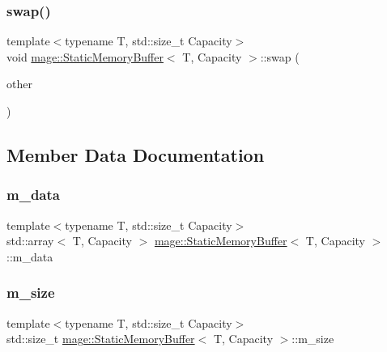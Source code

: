 \subsubsection{\texorpdfstring{swap()}{swap()}}
{\footnotesize\ttfamily template$<$typename T, std\+::size\+\_\+t Capacity$>$ \\
void \mbox{\hyperlink{classmage_1_1_static_memory_buffer}{mage\+::\+Static\+Memory\+Buffer}}$<$ T, Capacity $>$\+::swap (\begin{DoxyParamCaption}\item[{\mbox{\hyperlink{classmage_1_1_static_memory_buffer}{Static\+Memory\+Buffer}}$<$ T, Capacity $>$ \&}]{other }\end{DoxyParamCaption})\hspace{0.3cm}{\ttfamily [noexcept]}}



\subsection{Member Data Documentation}
\mbox{\label{classmage_1_1_static_memory_buffer_a6259631e14e48f322a2c16bc8d73031f}} 
\subsubsection{\texorpdfstring{m\+\_\+data}{m\_data}}
{\footnotesize\ttfamily template$<$typename T, std\+::size\+\_\+t Capacity$>$ \\
std\+::array$<$ T, Capacity $>$ \mbox{\hyperlink{classmage_1_1_static_memory_buffer}{mage\+::\+Static\+Memory\+Buffer}}$<$ T, Capacity $>$\+::m\+\_\+data\hspace{0.3cm}{\ttfamily [private]}}

\mbox{\label{classmage_1_1_static_memory_buffer_a50075b4c8c9d19bd51d32525162470ad}} 
\subsubsection{\texorpdfstring{m\+\_\+size}{m\_size}}
{\footnotesize\ttfamily template$<$typename T, std\+::size\+\_\+t Capacity$>$ \\
std\+::size\+\_\+t \mbox{\hyperlink{classmage_1_1_static_memory_buffer}{mage\+::\+Static\+Memory\+Buffer}}$<$ T, Capacity $>$\+::m\+\_\+size\hspace{0.3cm}{\ttfamily [private]}}

